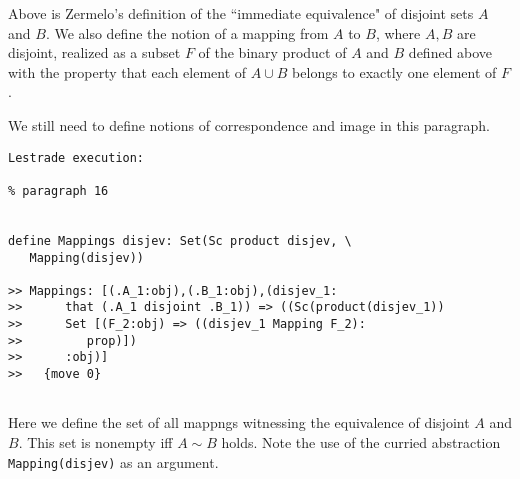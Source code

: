 \documentclass[12pt]{article}
\begin{document}
Above is Zermelo's definition of the ``immediate equivalence" of disjoint sets $A$ and $B$.  We also define the notion of a mapping from $A$ to $B$, where $A,B$ are disjoint, 
realized as a subset $F$ of the binary product of $A$ and $B$ defined above with the property that each element of $A \cup B$ belongs to exactly one element of $F$.

We still need to define notions of correspondence and image in this paragraph.

\begin{verbatim}Lestrade execution:

% paragraph 16


define Mappings disjev: Set(Sc product disjev, \
   Mapping(disjev))

>> Mappings: [(.A_1:obj),(.B_1:obj),(disjev_1:
>>      that (.A_1 disjoint .B_1)) => ((Sc(product(disjev_1))
>>      Set [(F_2:obj) => ((disjev_1 Mapping F_2):
>>         prop)])
>>      :obj)]
>>   {move 0}


\end{verbatim}

Here we define the set of all mappngs witnessing the equivalence of disjoint $A$ and $B$.  This set is nonempty iff $A \sim B$ holds.  Note the use of the curried abstraction
{\tt Mapping(disjev)} as an argument.
\end{document}
